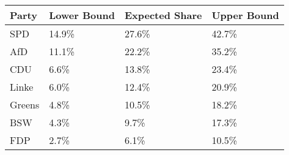 \begin{tabular}{llll}
  \hline
Party & Lower Bound & Expected Share & Upper Bound \\ 
  \hline
SPD & 14.9\% & 27.6\% & 42.7\% \\ 
  AfD & 11.1\% & 22.2\% & 35.2\% \\ 
  CDU & 6.6\% & 13.8\% & 23.4\% \\ 
  Linke & 6.0\% & 12.4\% & 20.9\% \\ 
  Greens & 4.8\% & 10.5\% & 18.2\% \\ 
  BSW & 4.3\% & 9.7\% & 17.3\% \\ 
  FDP & 2.7\% & 6.1\% & 10.5\% \\ 
   \hline
\end{tabular}
